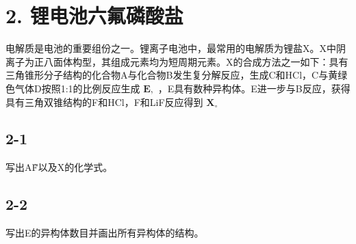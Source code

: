 \section*{2. 锂电池六氟磷酸盐}
电解质是电池的重要组份之⼀。锂离⼦电池中，最常⽤的电解质为锂盐X。X中阴离⼦为正⼋⾯体构型，其组成元素均为短周期元素。X的合成⽅法之⼀如下：具有三⻆锥形分⼦结构的化合物A与化合物B发⽣复分解反应，⽣成C和HCl，C与⻩绿⾊⽓体D按照1:1的⽐例反应⽣成 $\mathbf { E } ,$ ，E具有数种异构体。E进⼀步与B反应，获得具有三⻆双锥结构的F和HCl，F和LiF反应得到 $\mathbf { X } _ { \circ }$

\subsection*{2-1}
写出A\~F以及X的化学式。

\subsection*{2-2}
写出E的异构体数⽬并画出所有异构体的结构。
